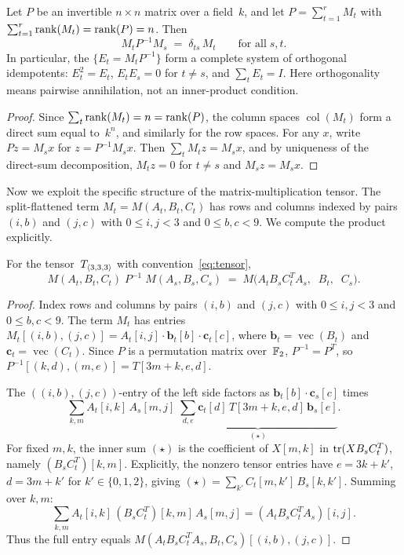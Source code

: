 \documentclass[11pt,a4paper]{article}
\begin{document}
\begin{lemma}\label{lem:saturation}
  Let $P$ be an invertible $n\times n$ matrix over a field~$k$, and let $P=\sum_{t=1}^r M_t$ with $\sum_{t=1}^r\operatorname{rank}(M_t)=\operatorname{rank}(P)=n$.  Then
  \begin{equation}\label{eq:idempotent}
    M_t P^{-1} M_s \;=\; \delta_{ts}\,M_t \qquad\text{for all}\;s,t.
  \end{equation}
  In particular, the $\{E_t=M_tP^{-1}\}$ form a complete system of orthogonal idempotents: $E_t^2=E_t$, $E_tE_s=0$ for $t\ne s$, and $\sum_tE_t=I$. Here orthogonality means pairwise annihilation, not an inner-product condition.
\end{lemma}

\begin{proof}
  Since $\sum_t\operatorname{rank}(M_t)=n=\operatorname{rank}(P)$, the column spaces $\operatorname{col}(M_t)$ form a direct sum equal to~$k^n$, and similarly for the row spaces.  For any $x$, write $Pz=M_sx$ for $z=P^{-1}M_sx$.  Then $\sum_t M_tz=M_sx$, and by uniqueness of the direct-sum decomposition, $M_tz=0$ for $t\ne s$ and $M_sz=M_sx$.
\end{proof}

Now we exploit the specific structure of the matrix-multiplication tensor.  The split-flattened term $M_t=M(A_t,B_t,C_t)$ has rows and columns indexed by pairs $(i,b)$ and $(j,c)$ with $0\le i,j<3$ and $0\le b,c<9$.  We compute the product explicitly.

\begin{proposition}\label{prop:product}
  For the tensor~$T_{\langle3,3,3\rangle}$ with convention~\eqref{eq:tensor},
  \begin{equation}\label{eq:product}
    M(A_t,B_t,C_t)\;P^{-1}\;M(A_s,B_s,C_s)
    \;=\;
    M\bigl(A_t B_s C_t^T A_s,\;\; B_t,\;\; C_s\bigr).
  \end{equation}
\end{proposition}

\begin{proof}
  Index rows and columns by pairs $(i,b)$ and $(j,c)$ with $0\le i,j<3$ and $0\le b,c<9$.  The term $M_t$ has entries $M_t[(i,b),(j,c)] = A_t[i,j]\cdot\mathbf{b}_t[b]\cdot\mathbf{c}_t[c]$, where $\mathbf{b}_t=\operatorname{vec}(B_t)$ and $\mathbf{c}_t=\operatorname{vec}(C_t)$.  Since $P$ is a permutation matrix over~$\mathbb{F}_2$, $P^{-1}=P^T$, so $P^{-1}[(k,d),(m,e)]=T[3m+k,e,d]$.

  The $((i,b),(j,c))$-entry of the left side factors as $\mathbf{b}_t[b]\cdot\mathbf{c}_s[c]$ times
  \[
    \sum_{k,m} A_t[i,k]\,A_s[m,j] \;\underbrace{\sum_{d,e}\mathbf{c}_t[d]\,T[3m+k,e,d]\,\mathbf{b}_s[e]}_{(\star)}.
  \]
  For fixed $m,k$, the inner sum $(\star)$ is the coefficient of $X[m,k]$ in $\operatorname{tr}(XB_sC_t^T)$, namely $(B_sC_t^T)[k,m]$. Explicitly, the nonzero tensor entries have $e=3k+k'$, $d=3m+k'$ for $k'\in\{0,1,2\}$, giving $(\star)=\sum_{k'}C_t[m,k']\,B_s[k,k']$. Summing over $k,m$:
  \[
    \sum_{k,m}A_t[i,k]\,(B_sC_t^T)[k,m]\,A_s[m,j] = (A_tB_sC_t^TA_s)[i,j].
  \]
  Thus the full entry equals $M(A_tB_sC_t^TA_s,B_t,C_s)[(i,b),(j,c)]$.
\end{proof}
\end{document}
